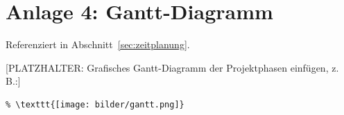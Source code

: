 \section*{Anlage 4: Gantt-Diagramm}
\label{anh:gantt}
Referenziert in Abschnitt~\ref{sec:zeitplanung}.

[PLATZHALTER: Grafisches Gantt-Diagramm der Projektphasen einf\"ugen, z.\,B.:]
\begin{verbatim}
% \texttt{[image: bilder/gantt.png]}
\end{verbatim}
